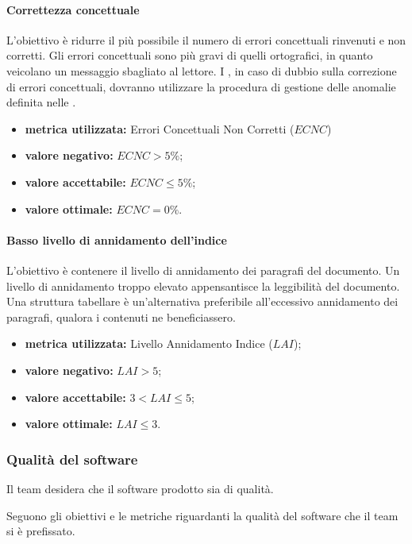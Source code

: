 		\paragraph{Correttezza concettuale}
			\label{OCC}
			L'obiettivo è ridurre il più possibile il numero di errori concettuali rinvenuti e non corretti. Gli errori concettuali sono più gravi di quelli ortografici, in quanto veicolano un messaggio sbagliato al lettore. I \verificatori, in caso di dubbio sulla correzione di errori concettuali, dovranno utilizzare la procedura di gestione delle anomalie definita nelle \ndpv.
			\begin{itemize}
				\item \textbf{metrica utilizzata:} Errori Concettuali Non Corretti ($ECNC$)
				\item \textbf{valore negativo:} $ECNC>5\%$;
				\item \textbf{valore accettabile:} $ECNC\leq5\%$;
				\item \textbf{valore ottimale:} $ECNC=0\%$.
			\end{itemize}
		
		\paragraph{Basso livello di annidamento dell'indice} 
		\label{OBLDAI}
		L'obiettivo è contenere il livello di annidamento dei paragrafi del documento. Un livello di annidamento troppo elevato appensantisce la leggibilità del documento. Una struttura tabellare è un'alternativa preferibile all'eccessivo annidamento dei paragrafi, qualora i contenuti ne beneficiassero.
		\begin{itemize}
			\item \textbf{metrica utilizzata:} Livello Annidamento Indice ($LAI$);
			\item \textbf{valore negativo:} $LAI>5$;
			\item \textbf{valore accettabile:} $3<LAI\leq5$;
			\item \textbf{valore ottimale:} $LAI\leq3$.
		\end{itemize}
		
		
	\subsubsection{Qualità del software}
		Il team desidera che il software prodotto sia di qualità.
		
		
		Seguono gli obiettivi e le metriche riguardanti la qualità del software che il team si è prefissato.

